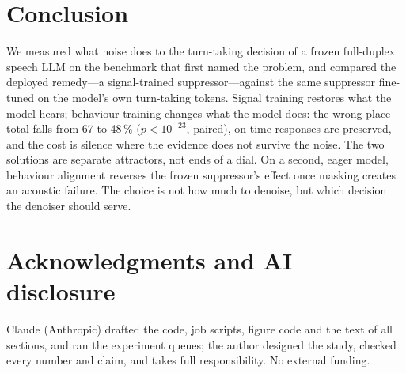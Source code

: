 \documentclass{article}
\begin{document}
\section{Conclusion}
We measured what noise does to the turn-taking decision of a frozen full-duplex speech LLM on
the benchmark that first named the problem, and compared the deployed remedy---a
signal-trained suppressor---against the same suppressor fine-tuned on the model's own
turn-taking tokens. Signal training restores what the model hears; behaviour training changes
what the model does: the wrong-place total falls from 67 to 48\,\% ($p<10^{-23}$, paired), on-time
responses are preserved, and the cost is silence where the evidence does not survive the noise.
The two solutions are separate attractors, not ends of a dial. On a second, eager model, behaviour
alignment reverses the frozen suppressor's effect once masking creates an acoustic failure. The choice is not how much
to denoise, but which decision the denoiser should serve.

\section{Acknowledgments and AI disclosure}
Claude (Anthropic) drafted the code, job scripts, figure code and the text of all sections, and ran the experiment queues; the author designed the study, checked every number and claim, and takes full responsibility. No external funding.

\clearpage


\end{document}
